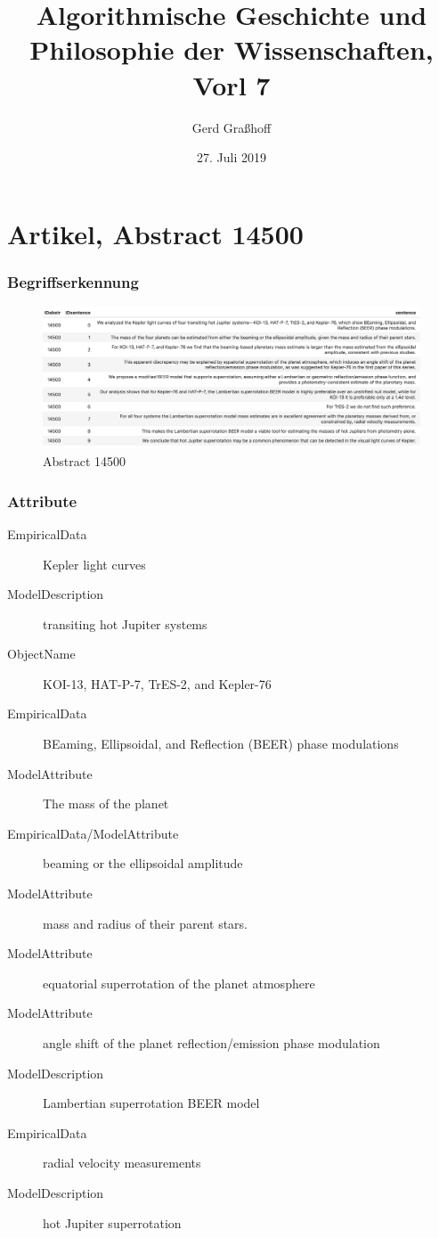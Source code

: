 \documentclass[11pt]{beamer}
\author{Gerd Graßhoff}
\title{Algorithmische Geschichte und Philosophie der Wissenschaften, Vorl 7}
\date{27. Juli 2019}
\begin{document}
	\begin{frame}[plain]
		\maketitle
	\end{frame}
	

\section{Artikel, Abstract 14500}

	\begin{frame}
	\frametitle{Begriffserkennung}


\begin{figure}
	\centering
	\includegraphics[width=1\linewidth]{screenshot001}
	\caption{Abstract 14500}
	\label{fig:screenshot001}
\end{figure}

\end{frame}

\begin{frame}
\frametitle{Attribute}

\begin{description}
	\item[EmpiricalData] Kepler light curves
	\item[ModelDescription] transiting hot Jupiter systems
	\item[ObjectName] KOI-13, HAT-P-7, TrES-2, and Kepler-76
	\item[EmpiricalData] BEaming, Ellipsoidal, and Reflection (BEER) phase modulations
	\item[ModelAttribute] The mass of the planet
	\item[EmpiricalData/ModelAttribute] beaming or the ellipsoidal amplitude
	\item[ModelAttribute] mass and radius of their parent stars.
	\item[ModelAttribute]equatorial superrotation of the planet atmosphere
	\item[ModelAttribute] angle shift of the planet reflection/emission phase modulation
	\item[ModelDescription]Lambertian superrotation BEER model	
	\item[EmpiricalData]radial velocity measurements
	\item[ModelDescription] hot Jupiter superrotation
\end{description}

\end{frame}
\end{document}

